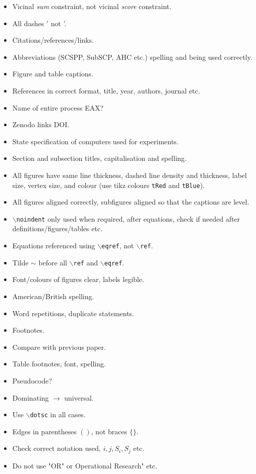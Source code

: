 \documentclass{elsarticle}
\begin{document}
{\color{myAqua}
\begin{itemize}[leftmargin=*]
	\item Vicinal \emph{sum} constraint, not vicinal \emph{score} constraint.
	\item All dashes $'$ not '. 
	\item Citations/references/links.
	\item Abbreviations (SCSPP, SubSCP, AHC etc.) spelling and being used correctly.
	\item Figure and table captions.
	\item References in correct format, title, year, authors, journal etc.
	\item Name of entire process EAX?
	\item Zenodo links DOI.
	\item State specification of computers used for experiments.
	\item Section and subsection titles, capitalisation and spelling.
	\item All figures have same line thickness, dashed line density and thickness, label size, vertex size, and colour (use tikz colours \texttt{tRed} and \texttt{tBlue}).
	\item All figures aligned correctly, subfigures aligned so that the captions are level.
	\item \texttt{$\backslash$noindent} only used when required, after equations, check if needed after definitions/figures/tables etc.
	\item Equations referenced using \texttt{$\backslash$eqref}, not \texttt{$\backslash$ref}.
	\item Tilde $\sim$ before all \texttt{$\backslash$ref} and \texttt{$\backslash$eqref}.
	\item Font/colours of figures clear, labels legible.
	\item American/British spelling.
	\item Word repetitions, duplicate statements.
	\item Footnotes.
	\item Compare with previous paper.
	\item Table footnotes, font, spelling.
	\item Pseudocode?
	\item Dominating $\to$ universal.
	\item Use \texttt{$\backslash$dotsc} in all cases.
	\item Edges in parentheses $()$, not braces $\{\}$.
	\item Check correct notation used, $i, j, S_i, S_j$ etc.
	\item Do not use "OR" or Operational Research" etc.
\end{itemize}		
}



\end{document}
